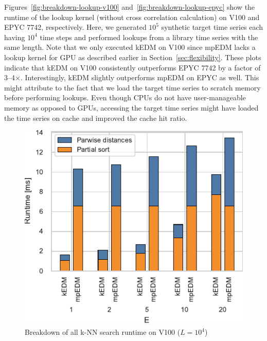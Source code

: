 \documentclass[sigconf]{acmart}
\begin{document}
Figures~\ref{fig:breakdown-lookup-v100} and~\ref{fig:breakdown-lookup-epyc}
show the runtime of the lookup kernel (without cross correlation calculation) on V100 and EPYC 7742, respectively.
Here, we generated $10^5$ synthetic target time series each having $10^4$ time
steps and performed lookups from a library time series with the same length.
Note that we only executed kEDM on
V100 since mpEDM lacks a lookup kernel for GPU as described earlier in
Section~\ref{sec:flexibility}. These plots indicate that kEDM on V100
consistently outperforms EPYC 7742 by a factor of 3--4$\times$.
Interestingly, kEDM slightly outperforms mpEDM on EPYC as well.
This might attribute to the fact that we load the target time series to scratch memory before performing lookups. Even though CPUs do not have user-manageable memory as opposed to GPUs, accessing the
target time series might have loaded the time series on cache and improved the
cache hit ratio.

\begin{figure}
    \centering
    \includegraphics[width=.90\linewidth]{figs/breakdown_knn_v100}
    \caption{Breakdown of all k-NN search runtime on V100 ($L=10^4$)}%
    \label{fig:breakdown-knn-v100}
\end{figure}
\end{document}
